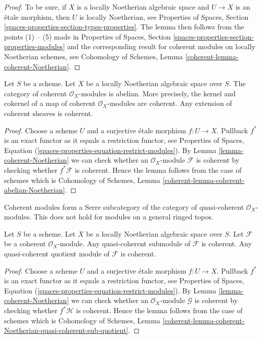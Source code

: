 \begin{proof}
To be sure, if $X$ is a locally Noetherian algebraic space and
$U \to X$ is an \'etale morphism, then $U$ is locally Noetherian, see
Properties of Spaces, Section \ref{spaces-properties-section-types-properties}.
The lemma then follows from the points (1) -- (5) made in
Properties of Spaces, Section \ref{spaces-properties-section-properties-modules}
and the corresponding result for coherent modules on locally
Noetherian schemes, see
Cohomology of Schemes, Lemma \ref{coherent-lemma-coherent-Noetherian}.
\end{proof}

\begin{lemma}
\label{lemma-coherent-abelian-Noetherian}
Let $S$ be a scheme. Let $X$ be a locally Noetherian algebraic space over $S$.
The category of coherent $\mathcal{O}_X$-modules is abelian. More precisely,
the kernel and cokernel of a map of coherent $\mathcal{O}_X$-modules are
coherent. Any extension of coherent sheaves is coherent.
\end{lemma}

\begin{proof}
Choose a scheme $U$ and a surjective \'etale morphism $f : U \to X$.
Pullback $f^*$ is an exact functor as it equals a restriction functor, see
Properties of Spaces, Equation
(\ref{spaces-properties-equation-restrict-modules}).
By
Lemma \ref{lemma-coherent-Noetherian} we can check whether an
$\mathcal{O}_X$-module $\mathcal{F}$ is
coherent by checking whether $f^*\mathcal{F}$ is coherent. Hence the
lemma follows from the case of schemes which is
Cohomology of Schemes, Lemma \ref{coherent-lemma-coherent-abelian-Noetherian}.
\end{proof}

\noindent
Coherent modules form a Serre subcategory of the
category of quasi-coherent $\mathcal{O}_X$-modules. This does not hold
for modules on a general ringed topos.

\begin{lemma}
\label{lemma-coherent-Noetherian-quasi-coherent-sub-quotient}
Let $S$ be a scheme.
Let $X$ be a locally Noetherian algebraic space over $S$.
Let $\mathcal{F}$ be a coherent $\mathcal{O}_X$-module.
Any quasi-coherent submodule of $\mathcal{F}$ is coherent.
Any quasi-coherent quotient module of $\mathcal{F}$ is coherent.
\end{lemma}

\begin{proof}
Choose a scheme $U$ and a surjective \'etale morphism $f : U \to X$.
Pullback $f^*$ is an exact functor as it equals a restriction functor, see
Properties of Spaces, Equation
(\ref{spaces-properties-equation-restrict-modules}).
By
Lemma \ref{lemma-coherent-Noetherian} we can check whether an
$\mathcal{O}_X$-module $\mathcal{G}$ is
coherent by checking whether $f^*\mathcal{H}$ is coherent. Hence the
lemma follows from the case of schemes which is
Cohomology of Schemes, Lemma
\ref{coherent-lemma-coherent-Noetherian-quasi-coherent-sub-quotient}.
\end{proof}





